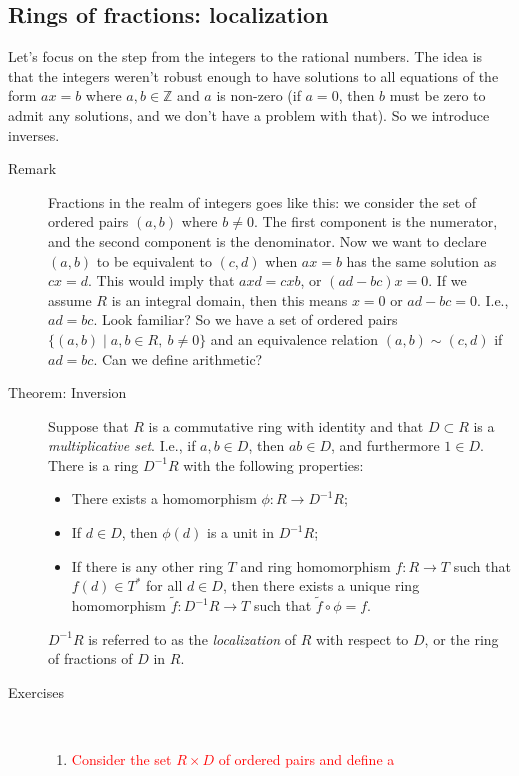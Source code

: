 \documentclass[12pt]{article}
\newcommand{\bbZ}{\mathbb{Z}}
\newcounter{excounter}[subsection]
\newcommand{\exercise}[1]{
\addtocounter{excounter}{1}
\textcolor{red}{\fbox{\Large \Roman{section}.\roman{subsection}.\arabic{excounter}} #1}
}
\begin{document}
\subsection{Rings of fractions: localization}
\label{sec:rings-fractions}

Let's focus on the step from the integers to the rational numbers. The
idea is that the integers weren't robust enough to have solutions to
all equations of the form $ax=b$ where $a,b\in \bbZ$ and $a$ is
non-zero (if $a=0$, then $b$ must be zero to admit any solutions, and
we don't have a problem with that). So
we introduce inverses.
\begin{description}
\item[Remark] Fractions in the realm of integers goes like this: we
  consider the set of ordered pairs $(a,b)$ where $b\neq 0$. The first
  component is the numerator, and the second component is the
  denominator. Now we want to declare $(a,b)$ to be equivalent to
  $(c,d)$ when $ax=b$ has the same solution as $cx=d$. This would
  imply that $axd=cxb$, or $(ad-bc)x=0$. If we assume $R$ is an
  integral domain, then this means $x=0$ or $ad-bc=0$. I.e.,
  $ad=bc$. Look familiar? So we have a set of ordered pairs $\{(a,b)
  \mid a,b\in R,\ b\neq 0\}$ and an equivalence relation $(a,b)\sim
  (c,d)$ if $ad=bc$. Can we define arithmetic? 
\item[Theorem: Inversion] Suppose that $R$ is a commutative ring with identity and
  that $D\subset R$ is a \emph{multiplicative set}. I.e., if $a,b\in
  D$, then $ab\in D$, and furthermore $1\in D$. There is a ring
  $D^{-1}R$ with the following properties:
  \begin{itemize}
  \item There exists a homomorphism $\phi: R\rightarrow D^{-1}R$;
  \item If $d\in D$, then $\phi(d)$ is a unit in $D^{-1}R$;
  \item If there is any other ring $T$ and ring homomorphism $f:
    R\rightarrow T$ such that $f(d)\in T^*$ for all $d\in D$, then
    there exists a unique ring homomorphism $\tilde{f}:D^{-1}R\rightarrow T$
    such that $\tilde{f}\circ \phi = f$. 
  \end{itemize}
$D^{-1}R$ is referred to as the \emph{localization} of $R$ with
respect to $D$, or the ring of fractions of $D$ in $R$. 
\item[Exercises]\ 
  \begin{enumerate}
  \item \exercise{Consider the set $R\times D$ of ordered pairs and define a
}
\end{enumerate}
\end{description}
\end{document}
